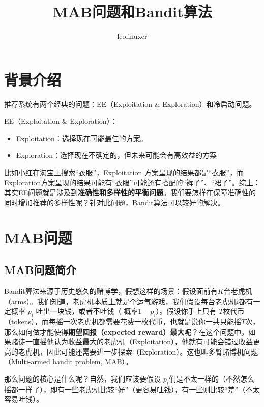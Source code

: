 \documentclass[12pt]{article}
\title{MAB问题和Bandit算法\cite{Bandit_Algorithm_Recommender_System_Learning_Note}\cite{MAB_And_RL_Introduction}}
\author{leolinuxer}
\begin{document}
\maketitle
\tableofcontents

\section{背景介绍}
推荐系统有两个经典的问题：EE（Exploitation \& Exploration）和冷启动问题。

EE（Exploitation \& Exploration）：
\begin{itemize}
\setlength{\itemsep}{0pt}
\setlength{\parsep}{0pt}
\setlength{\parskip}{0pt}
    \item Exploitation：选择现在可能最佳的方案。
    \item Exploration：选择现在不确定的，但未来可能会有高效益的方案
\end{itemize}

比如小红在淘宝上搜索“衣服”，Exploitation 方案呈现的结果都是“衣服”，而Exploration方案呈现的结果可能有“衣服”可能还有搭配的“裤子”、“裙子”。综上：其实EE问题就是涉及到\textbf{准确性和多样性的平衡问题}。我们要怎样在保障准确性的同时增加推荐的多样性呢？针对此问题，Bandit算法可以较好的解决。

\section{MAB问题}
\subsection{MAB问题简介}
Bandit算法来源于历史悠久的赌博学，假想这样的场景：假设面前有$K$台老虎机（arms）。我们知道，老虎机本质上就是个运气游戏，我们假设每台老虎机$i$都有一定概率 $p_i$ 吐出一块钱，或者不吐钱（ 概率$1-p_i$）。假设你手上只有 $T$枚代币（tokens），而每摇一次老虎机都需要花费一枚代币，也就是说你一共只能摇$T$次，那么如何做才能使得\textbf{期望回报（expected reward）最大}呢？在这个问题中，如果赌徒一直摇他认为收益最大的老虎机（Exploitation），他就有可能会错过收益更高的老虎机，因此可能还需要进一步探索（Exploration）。这也叫多臂赌博机问题（Multi-armed bandit problem, MAB）。

那么问题的核心是什么呢？自然，我们应该要假设 $p_i$们是不太一样的（不然怎么摇都一样了），即有一些老虎机比较“好”（更容易吐钱），有一些则比较“差”（不太容易吐钱）。
\end{document}
